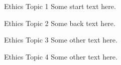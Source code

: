\documentclass[../custom,grid]{flashcards}
\begin{document}

\begin{flashcard}{Ethics Topic 1}
    Some start text here.
\end{flashcard}

\begin{flashcard}{Ethics Topic 2}
    Some back text here.
\end{flashcard}

\begin{flashcard}{Ethics Topic 3}
    Some other text here.
\end{flashcard}

\begin{flashcard}{Ethics Topic 4}
    Some other text here.
\end{flashcard}
\end{document}
